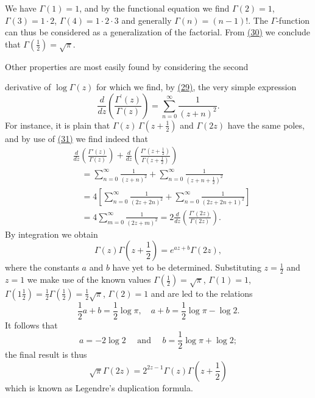We have $\Gamma(1) = 1$, and by the functional equation we find $\Gamma(2) = 1$, $\Gamma(3) = 1 \cdot 2$, $\Gamma(4) = 1 \cdot 2 \cdot 3$ and generally $\Gamma(n) = (n - 1)!$. The $\Gamma$-function can thus be considered as a generalization of the factorial. From \hyperref[eq:5.30]{(30)} we conclude that $\Gamma(\frac{1}{2}) = \sqrt{\pi}$.

Other properties are most easily found by considering the second


derivative of $\log \Gamma(z)$ for which we find, by \hyperref[eq:5.29]{(29)}, the very simple expression
\begin{equation*}
\frac {d}{d z} \left(\frac {\Gamma^ {\prime} (z)}{\Gamma (z)}\right) = \sum_ {n = 0} ^ {\infty} \frac {1}{(z + n) ^ {2}}.\tag{31}\label{eq:5.31}
\end{equation*}
For instance, it is plain that $\Gamma(z)\,\Gamma(z + \frac{1}{2})$ and $\Gamma(2z)$ have the same poles, and by use of \hyperref[eq:5.31]{(31)} we find indeed that
\begin{equation*}
\begin{aligned}
&\frac{d}{dz}\left(\frac{\Gamma'(z)}{\Gamma(z)}\right)
+\frac{d}{dz}\left(\frac{\Gamma'(z+\frac12)}{\Gamma(z+\frac12)}\right)\\
&\quad=\sum_{n=0}^\infty\frac1{(z+n)^2}
+\sum_{n=0}^\infty\frac1{(z+n+\frac12)^2}\\
&\quad=4\left[\sum_{n=0}^\infty\frac1{(2z+2n)^2}
+\sum_{n=0}^\infty\frac1{(2z+2n+1)^2}\right]\\
&\quad=4\sum_{m=0}^\infty\frac1{(2z+m)^2}
=2\frac{d}{dz}\left(\frac{\Gamma'(2z)}{\Gamma(2z)}\right).
\end{aligned}
\end{equation*}
By integration we obtain
\begin{equation*}
\Gamma (z) \Gamma (z + \frac {1}{2}) = e ^ {a z + b} \Gamma (2 z),
\end{equation*}
where the constants $a$ and $b$ have yet to be determined. Substituting $z = \frac{1}{2}$ and $z = 1$ we make use of the known values $\Gamma(\frac{1}{2}) = \sqrt{\pi}$, $\Gamma(1) = 1$, $\Gamma(1\frac{1}{2}) = \frac{1}{2}\Gamma(\frac{1}{2}) = \frac{1}{2}\sqrt{\pi}$, $\Gamma(2) = 1$ and are led to the relations
\begin{equation*}
\frac {1}{2} a + b = \frac {1}{2} \log \pi , \quad a + b = \frac {1}{2} \log \pi - \log 2.
\end{equation*}
It follows that
\begin{equation*}
a = - 2 \log 2 \quad \text { and } \quad b = \frac {1}{2} \log \pi + \log 2;
\end{equation*}
the final result is thus
\begin{equation*}
\sqrt {\pi} \Gamma (2 z) = 2 ^ {2 z - 1} \Gamma (z) \Gamma (z + \frac {1}{2})
\end{equation*}
which is known as Legendre's duplication formula.

